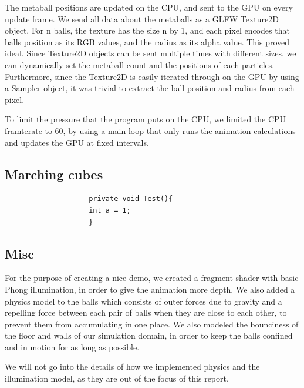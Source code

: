 \documentclass{article}
\begin{document}
\begin{multicols}{2}
        The metaball positions are updated on the CPU, and sent to the GPU on every update frame. We send all data about the metaballs as a GLFW Texture2D object. For n balls, the texture has the size n by 1, and each pixel encodes that balls position as its RGB values, and the radius as its alpha value. This proved ideal. Since Texture2D objects can be sent multiple times with different sizes, we can dynamically set the metaball count and the positions of each particles. Furthermore, since the Texture2D is easily iterated through on the GPU by using a Sampler object, it was trivial to extract the ball position and radius from each pixel.

        To limit the pressure that the program puts on the CPU, we limited the CPU framterate to 60, by using a main loop that only runs the animation calculations and updates the GPU at fixed intervals.


        \subsection{Marching cubes}
        	\begin{minipage}{\linewidth}
			    \begin{lstlisting}
					private void Test(){
					int a = 1;
					}
				\end{lstlisting}
        	\end{minipage}

        \subsection{Misc}
            For the purpose of creating a nice demo, we created a fragment shader with basic Phong illumination, in order to give the animation more depth.
            We also added a physics model to the balls which consists of outer forces due to gravity and a repelling force between each pair of balls when they are close to each other, to prevent them from accumulating in one place.
            We also modeled the bounciness of the floor and walls of our simulation domain, in order to keep the balls confined and in motion for as long as possible.

            We will not go into the details of how we implemented physics and the illumination model, as they are out of the focus of this report.


\end{multicols}
\end{document}
